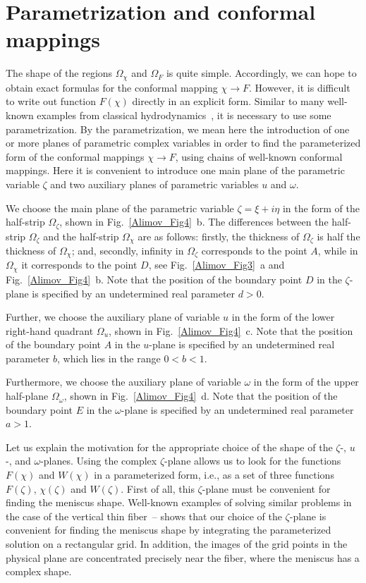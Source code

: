 \documentclass[
11pt,%
tightenlines,%
twoside,%
onecolumn,%
nofloats,%
nobibnotes,%
nofootinbib,%
superscriptaddress,%
noshowpacs,%
centertags]%
{revtex4-2}
\begin{document}
\section{Parametrization and conformal mappings} \label{Alimov:sec5}
The shape of the regions $\Omega_\chi $ and $\Omega_F$ is quite simple. Accordingly, we can hope to
obtain exact formulas for the conformal mapping $\chi \to F$. However, it is difficult to write out
function $F(\chi)$ directly in an explicit form. Similar to many well-known examples from classical
hydrodynamics~\cite{Alimov:bib20}, it is necessary to use some parametrization. By the
parametrization, we mean here the introduction of one or more planes of parametric complex variables
in order to find the parameterized form of the conformal mappings $\chi \to F$, using chains of
well-known conformal mappings. Here it is convenient to introduce one main plane of the parametric
variable $\zeta$ and two auxiliary planes of parametric variables $u$ and $\omega$.

We choose the main plane of the parametric variable $\zeta = \xi + i\eta$ in the form of the
half-strip $\Omega_\zeta $, shown in Fig.~\ref{Alimov_Fig4}~b. The differences between the
half-strip $\Omega_\zeta$ and the half-strip $\Omega_\chi$ are as follows: firstly, the thickness
of $\Omega_\zeta$ is half the thickness of $\Omega_\chi$; and, secondly, infinity in $\Omega_\zeta$
corresponds to the point $A$, while in $\Omega_\chi $ it corresponds to the point $D$, see
Fig.~\ref{Alimov_Fig3}~a and Fig.~\ref{Alimov_Fig4}~b. Note that the position of the boundary point
$D$ in the $\zeta$-plane is specified by an undetermined real parameter $d > 0$.

Further, we choose the auxiliary plane of variable $u$ in the form of the lower right-hand quadrant
$\Omega_u$, shown in Fig.~\ref{Alimov_Fig4}~c. Note that the position of the boundary point $A$ in
the $u$-plane is specified by an undetermined real parameter $b$, which lies in the range $0 < b <
1$.

Furthermore, we choose the auxiliary plane of variable $\omega$ in the form of the upper half-plane
$\Omega_\omega$, shown in Fig.~\ref{Alimov_Fig4}~d. Note that the position of the boundary point $E$
in the $\omega$-plane is specified by an undetermined real parameter $a > 1$.

Let us explain the motivation for the appropriate choice of the shape of the $\zeta$-, $u$-, and
$\omega$-planes. Using the complex $\zeta$-plane allows us to look for the functions $F(\chi)$ and
$W(\chi)$ in a parameterized form, i.e., as a set of three functions $F(\zeta)$, $\chi(\zeta)$ and
$W(\zeta)$. First of all, this $\zeta$-plane must be convenient for finding the meniscus shape.
Well-known examples of solving similar problems in the case of the vertical thin
fiber~\cite{Alimov:bib5}--\cite{Alimov:bib8} shows that our choice of the $\zeta$-plane is
convenient for finding the meniscus shape by integrating the parameterized solution on a
rectangular grid. In addition, the images of the grid points in the physical plane are concentrated
precisely near the fiber, where the meniscus has a complex shape.
\end{document}
